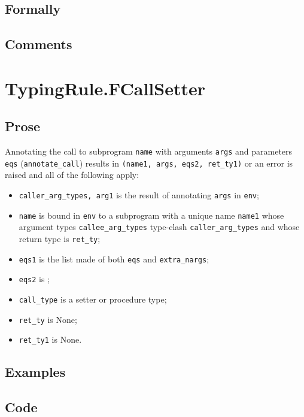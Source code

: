 \documentclass{book}
\begin{document}
  \subsection{Formally}

  \subsection{Comments}


\section{TypingRule.FCallSetter \label{sec:TypingRule.FCallSetter}}

  \subsection{Prose}
  Annotating the call to subprogram \texttt{name} with arguments \texttt{args}
and parameters \texttt{eqs} (\texttt{annotate\_call}) results in
\texttt{(name1, args, eqs2, ret\_ty1)} or an error is raised and all of the following apply:
   \begin{itemize}
   \item \texttt{caller\_arg\_types, arg1} is the result of annotating \texttt{args} in \texttt{env};
   \item \texttt{name} is bound in \texttt{env} to a subprogram with a unique name \texttt{name1} whose argument types \texttt{callee\_arg\_types} type-clash \texttt{caller\_arg\_types} and whose return type is \texttt{ret\_ty};
   \item \texttt{eqs1} is the list made of both \texttt{eqs} and \texttt{extra\_nargs};
   \item \texttt{eqs2} is ;
   \item \texttt{call\_type} is a setter or procedure type;
   \item \texttt{ret\_ty} is None;
   \item \texttt{ret\_ty1} is None.
   \end{itemize}

  \subsection{Examples}

  \subsection{Code}
\end{document}
